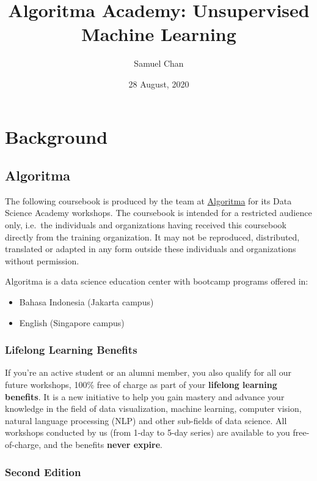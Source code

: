 \documentclass[]{article}
\title{Algoritma Academy: Unsupervised Machine Learning}
\author{Samuel Chan}
\date{28 August, 2020}
\providecommand{\tightlist}{%
  \setlength{\itemsep}{0pt}\setlength{\parskip}{0pt}}
\begin{document}
\maketitle

\hypertarget{background}{%
\section{Background}\label{background}}

\hypertarget{algoritma}{%
\subsection{Algoritma}\label{algoritma}}

The following coursebook is produced by the team at
\href{https://algorit.ma}{Algoritma} for its Data Science Academy
workshops. The coursebook is intended for a restricted audience only,
i.e.~the individuals and organizations having received this coursebook
directly from the training organization. It may not be reproduced,
distributed, translated or adapted in any form outside these individuals
and organizations without permission.

Algoritma is a data science education center with bootcamp programs
offered in:

\begin{itemize}
\tightlist
\item
  Bahasa Indonesia (Jakarta campus)\\
\item
  English (Singapore campus)
\end{itemize}

\hypertarget{lifelong-learning-benefits}{%
\subsubsection{Lifelong Learning
Benefits}\label{lifelong-learning-benefits}}

If you're an active student or an alumni member, you also qualify for
all our future workshops, 100\% free of charge as part of your
\textbf{lifelong learning benefits}. It is a new initiative to help you
gain mastery and advance your knowledge in the field of data
visualization, machine learning, computer vision, natural language
processing (NLP) and other sub-fields of data science. All workshops
conducted by us (from 1-day to 5-day series) are available to you
free-of-charge, and the benefits \textbf{never expire}.

\hypertarget{second-edition}{%
\subsubsection{Second Edition}\label{second-edition}}
\end{document}
